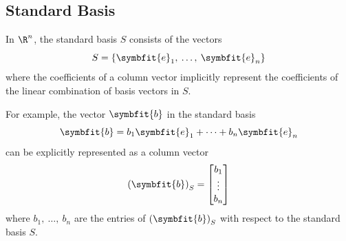 \documentclass{article}
\begin{document}
\subsection{Standard Basis}
In \(\R^n\), the standard basis \(S\) consists of the vectors
\begin{equation*}
    S = \left\{ \symbfit{e}_1,\: \dots,\: \symbfit{e}_n \right\}
\end{equation*}
where the coefficients of a column vector implicitly represent the coefficients
of the linear \linebreak combination of basis vectors in \(S\).

For example, the vector \(\symbfit{b}\) in the standard basis
\begin{equation*}
    \symbfit{b} = b_1 \symbfit{e}_1 + \cdots + b_n \symbfit{e}_n
\end{equation*}
can be explicitly represented as a column vector
\begin{equation*}
    \left( \symbfit{b} \right)_S = \begin{bmatrix}
        b_1    \\
        \vdots \\
        b_n
    \end{bmatrix}
\end{equation*}
where \(b_1,\: \dots,\: b_n\) are the entries of \(\left( \symbfit{b} \right)_S\) with respect to the standard basis \(S\).
\end{document}

